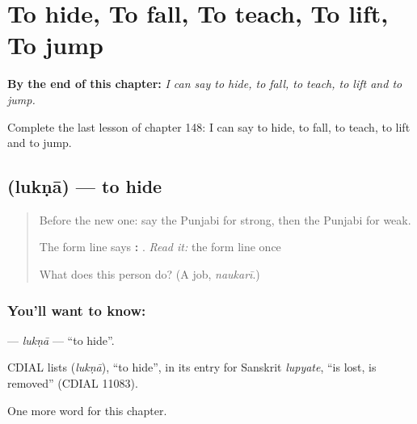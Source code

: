 
\chapter{To hide, To fall, To teach, To lift, To jump}
\label{ch:pa-to-hide-to-fall-to-teach-to-lift-to-jump}

\begin{chapteropening}
\textbf{By the end of this chapter:} \emph{I can say to hide, to fall, to teach, to lift and to jump.}

Complete the last lesson of chapter 148: I can say to hide, to fall, to teach, to lift and to jump.
\end{chapteropening}

\section[\texorpdfstring{\pa{ਲੁਕਣਾ} (lukṇā)}{ਲੁਕਣਾ (lukṇā)}]{ (lukṇā) — to hide}

\label{lesson:PA-C148-lukna}



\begin{quote}
Before the new one: say the Punjabi for strong, then the Punjabi for weak.

The form line says \textbf{: }. \emph{Read it:} the form line once

What does this person do? (A job, \emph{naukarī}.)
\end{quote}

\subsection*{You'll want to know: }
\textbf{} — \emph{lukṇā} — \textquotedblleft{}to hide\textquotedblright{}.

\begin{cousinweb}
CDIAL lists \textbf{} (\emph{lukṇā}), \textquotedblleft{}to hide\textquotedblright{}, in its entry for Sanskrit \emph{lupyate}, \textquotedblleft{}is lost, is removed\textquotedblright{} (CDIAL 11083).
\end{cousinweb}

\begin{grammarlens}[title={What you've built}]
One more word for this chapter.
\end{grammarlens}

